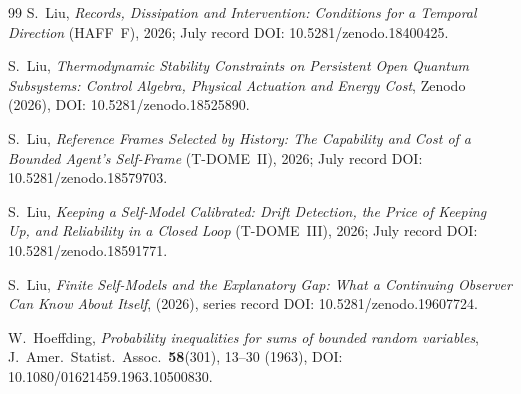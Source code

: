 \documentclass[12pt]{article}
\begin{document}
\begin{thebibliography}{99}
S.~Liu, \emph{Records, Dissipation and Intervention: Conditions for a Temporal Direction} (HAFF~F), 2026; July record DOI: 10.5281/zenodo.18400425.

S.~Liu, \emph{Thermodynamic Stability Constraints on Persistent Open Quantum Subsystems: Control Algebra, Physical Actuation and Energy Cost}, Zenodo (2026), DOI: 10.5281/zenodo.18525890.

S.~Liu, \emph{Reference Frames Selected by History: The Capability and Cost of a Bounded Agent's Self-Frame} (T-DOME~II), 2026; July record DOI: 10.5281/zenodo.18579703.

S.~Liu, \emph{Keeping a Self-Model Calibrated: Drift Detection, the Price of Keeping Up, and Reliability in a Closed Loop} (T-DOME~III), 2026; July record DOI: 10.5281/zenodo.18591771.

S.~Liu, \emph{Finite Self-Models and the Explanatory Gap: What a Continuing Observer Can Know About Itself}, (2026), series record DOI: 10.5281/zenodo.19607724.

W.~Hoeffding,
\emph{Probability inequalities for sums of bounded random variables},
J.~Amer.~Statist.~Assoc.~\textbf{58}(301), 13--30 (1963),
DOI: 10.1080/01621459.1963.10500830.

\end{thebibliography}
\end{document}
